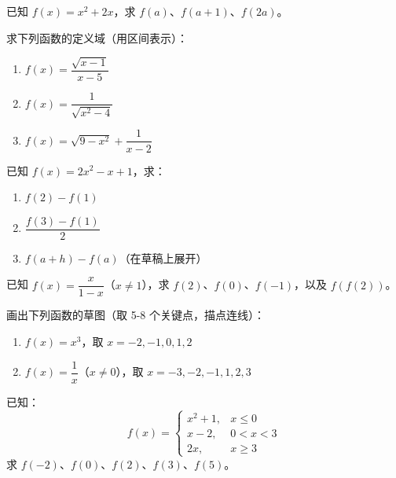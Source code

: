 \begin{exercise}[2]
已知 \(f(x) = x^2 + 2x\)，求 \(f(a)\)、\(f(a + 1)\)、\(f(2a)\)。
\end{exercise}


\begin{exercise}[3]
求下列函数的定义域（用区间表示）：
\begin{enumerate}
  \item[(1)] \(f(x) = \dfrac{\sqrt{x - 1}}{x - 5}\)
  \item[(2)] \(f(x) = \dfrac{1}{\sqrt{x^2 - 4}}\)
  \item[(3)] \(f(x) = \sqrt{9 - x^2} + \dfrac{1}{x - 2}\)
\end{enumerate}
\end{exercise}

\begin{exercise}[3]
已知 \(f(x) = 2x^2 - x + 1\)，求：
\begin{enumerate}
  \item[(1)] \(f(2) - f(1)\)
  \item[(2)] \(\dfrac{f(3) - f(1)}{2}\)
  \item[(3)] \(f(a + h) - f(a)\)（在草稿上展开）
\end{enumerate}
\end{exercise}

\begin{exercise}[3]
已知 \(f(x) = \dfrac{x}{1 - x}\)（\(x \neq 1\)），求 \(f(2)\)、\(f(0)\)、\(f(-1)\)，以及 \(f(f(2))\)。
\end{exercise}

\begin{exercise}[3]
画出下列函数的草图（取 5-8 个关键点，描点连线）：
\begin{enumerate}
  \item[(1)] \(f(x) = x^3\)，取 \(x = -2, -1, 0, 1, 2\)
  \item[(2)] \(f(x) = \dfrac{1}{x}\)（\(x \neq 0\)），取 \(x = -3, -2, -1, 1, 2, 3\)
\end{enumerate}
\end{exercise}

\begin{exercise}[3]
已知：
\[
f(x) =
\begin{cases}
x^2 + 1, & x \le 0 \\
x - 2,   & 0 < x < 3 \\
2x,      & x \ge 3
\end{cases}
\]
求 \(f(-2)\)、\(f(0)\)、\(f(2)\)、\(f(3)\)、\(f(5)\)。
\end{exercise}

